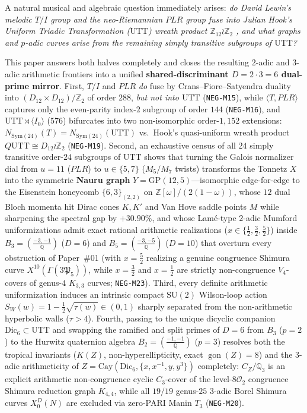 \documentclass[11pt]{amsart}
\numberwithin{equation}{section}
\theoremstyle{plain}
\theoremstyle{definition}\newtheorem{definition}[theorem]{Definition}
\theoremstyle{remark}\newtheorem{remark}[theorem]{Remark}
\newcommand{\Q}{\mathbb{Q}}
\newcommand{\Z}{\mathbb{Z}}
\newcommand{\calO}{\mathcal{O}}
\newcommand{\SU}{\mathrm{SU}}
\newcommand{\Cay}{\mathrm{Cay}}
\newcommand{\UTT}{\mathrm{UTT}}
\newcommand{\GP}{\mathrm{GP}}
\begin{document}
A natural musical and algebraic question immediately arises: \emph{do David Lewin's melodic $T/I$ group \cite{lewin1987} and the neo-Riemannian $PLR$ group \cite{cfs2009} fuse into Julian Hook's Uniform Triadic Transformation ($\UTT$) wreath product $\Z_{12}\wr\Z_2$ \cite{hook2002}, and what graphs and $p$-adic curves arise from the remaining simply transitive subgroups of $\UTT$?}

This paper answers both halves completely and closes the resulting $2$-adic and $3$-adic arithmetic frontiers into a unified \textbf{shared-discriminant $D=2\cdot 3=6$ dual-prime mirror}. First, $T/I$ and $PLR$ \emph{do} fuse by Crans--Fiore--Satyendra duality into $(D_{12}\times D_{12})/\Z_2$ of order $288$, \emph{but not into $\UTT$} (\texttt{NEG-M15}), while $\langle T, PLR\rangle$ captures only the even-parity index-$2$ subgroup of order $144$ (\texttt{NEG-M16}), and $\UTT\rtimes\langle I_0\rangle$ ($576$) bifurcates into two non-isomorphic order-$1{,}152$ extensions: $N_{\mathrm{Sym}(24)}(T)=N_{\mathrm{Sym}(24)}(\UTT)$ vs.\ Hook's quasi-uniform wreath product $Q\UTT\cong D_{12}\wr\Z_2$ (\texttt{NEG-M19}). Second, an exhaustive census of all $24$ simply transitive order-$24$ subgroups of $\UTT$ shows that turning the Galois normalizer dial from $u=11$ ($PLR$) to $u\in\{5,7\}$ ($M_5/M_7$ twists) transforms the Tonnetz $X$ into the symmetric \textbf{Nauru graph} $Y=\GP(12,5)$---isomorphic edge-for-edge to the Eisenstein honeycomb $\{6,3\}_{(2,2)}$ on $\Z[\omega]/(2(1-\omega))$, whose $12$ dual Bloch momenta hit Dirac cones $K,K'$ and Van Hove saddle points $M$ while sharpening the spectral gap by $+30.90\%$, and whose Lam\'e-type $2$-adic Mumford uniformizations admit exact rational arithmetic realizations ($x\in\{\tfrac12,\tfrac32,\tfrac52\}$) inside $B_3=(\frac{-3,-1}{\Q})$ ($D=6$) and $B_5=(\frac{-3,-5}{\Q})$ ($D=10$) that overturn every obstruction of Paper~\#01 (with $x=\tfrac52$ realizing a genuine congruence Shimura curve $X^{10}(\Gamma(3\mathfrak{P}_5))$, while $x=\tfrac32$ and $x=\tfrac12$ are strictly non-congruence $V_4$-covers of genus-$4$ $K_{3,3}$ curves; \texttt{NEG-M23}). Third, every definite arithmetic uniformization induces an intrinsic compact $\SU(2)$ Wilson-loop action $S_W(w)=1-\tfrac12\sqrt{\tau(w)}\in(0,1)$ sharply separated from the non-arithmetic hyperbolic walls ($\tau>4$). Fourth, passing to the unique dicyclic companion $\mathrm{Dic}_6\subset\UTT$ and swapping the ramified and split primes of $D=6$ from $B_3$ ($p=2$) to the Hurwitz quaternion algebra $B_2=(\frac{-1,-1}{\Q})$ ($p=3$) resolves both the tropical invariants ($K(Z)$, non-hyperellipticity, exact $\operatorname{gon}(Z)=8$) and the $3$-adic arithmeticity of $Z=\Cay(\mathrm{Dic}_6,\{x,x^{-1},y,y^3\})$ completely: $C_Z/\Q_3$ is an explicit arithmetic non-congruence cyclic $C_3$-cover of the level-$8\calO_2$ congruence Shimura reduction graph $K_{4,4}$, while all $19/19$ genus-$25$ $3$-adic Borel Shimura curves $X_0^D(N)$ are excluded via zero-PARI Manin $T_3$ (\texttt{NEG-M20}).
\end{document}
